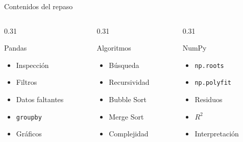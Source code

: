 \documentclass[10pt]{beamer}
\begin{document}
\begin{frame}{Contenidos del repaso}
  \begin{columns}
    \begin{column}{0.31\textwidth}
      \begin{block}{Pandas}
        \begin{itemize}
          \item Inspección
          \item Filtros
          \item Datos faltantes
          \item \texttt{groupby}
          \item Gráficos
        \end{itemize}
      \end{block}
    \end{column}
    \begin{column}{0.31\textwidth}
      \begin{block}{Algoritmos}
        \begin{itemize}
          \item Búsqueda
          \item Recursividad
          \item Bubble Sort
          \item Merge Sort
          \item Complejidad
        \end{itemize}
      \end{block}
    \end{column}
    \begin{column}{0.31\textwidth}
      \begin{block}{NumPy}
        \begin{itemize}
          \item \texttt{np.roots}
          \item \texttt{np.polyfit}
          \item Residuos
          \item \(R^2\)
          \item Interpretación
        \end{itemize}
      \end{block}
    \end{column}
  \end{columns}
\end{frame}
\end{document}
